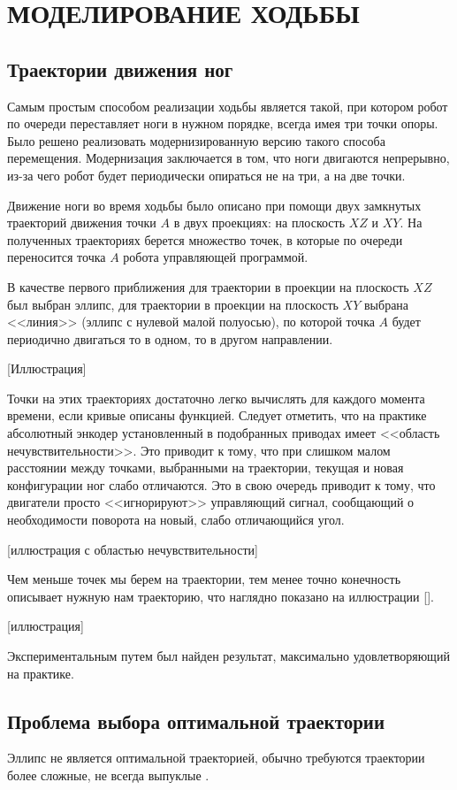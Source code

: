 \chapter{\MakeUppercase{Моделирование ходьбы}}
\section{Траектории движения ног}

Самым простым способом реализации ходьбы является такой, при котором робот по очереди переставляет ноги в нужном порядке, всегда имея три точки опоры. Было решено реализовать модернизированную версию такого способа перемещения. Модернизация заключается в том, что ноги двигаются непрерывно, из-за чего робот будет периодически опираться не на три, а на две точки.

Движение ноги во время ходьбы было описано при помощи двух замкнутых траекторий движения точки $ A $ в двух проекциях: на плоскость $ XZ $ и $ XY $. На полученных траекториях берется множество точек, в которые по очереди переносится точка $A$ робота управляющей программой.

В качестве первого приближения для траектории в проекции на плоскость $ XZ $ был выбран эллипс, для траектории в проекции на плоскость $ XY $ выбрана <<линия>> (эллипс с нулевой малой полуосью), по которой точка $ A $ будет периодично двигаться то в одном, то в другом направлении.

[Иллюстрация]

Точки на этих траекториях достаточно легко вычислять для каждого момента времени, если кривые описаны функцией. Следует отметить, что на практике абсолютный энкодер установленный в подобранных приводах имеет <<область нечувствительности>>. Это приводит к тому, что при слишком малом расстоянии между точками, выбранными на траектории, текущая и новая конфигурации ног слабо отличаются. Это в свою очередь приводит к тому, что двигатели просто <<игнорируют>> управляющий сигнал, сообщающий о необходимости поворота на новый, слабо отличающийся угол.

[иллюстрация с областью нечувствительности]

Чем меньше точек мы берем на траектории, тем менее точно конечность описывает нужную нам траекторию, что наглядно показано на иллюстрации [].

[иллюстрация]

Экспериментальным путем был найден результат, максимально удовлетворяющий на практике.


\section{Проблема выбора оптимальной траектории}

Эллипс не является оптимальной траекторией, обычно требуются траектории более сложные, не всегда выпуклые \cite{Singla2018}. 